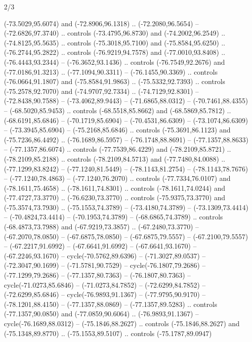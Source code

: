 \begin{flagdescription}{2/3}
\begin{scope}[xshift=0.3333\flaglength,yshift=0.5\flagwidth,scale=\flagwidth/711.3]
\begin{scope}
    (-73.5029,95.6074) and (-72.8906,96.1318) .. (-72.2080,96.5654) --
    (-72.6826,97.3740) .. controls (-73.4795,96.8730) and (-74.2002,96.2549) ..
    (-74.8125,95.5635) .. controls (-75.3018,95.7100) and (-75.8584,95.6250) ..
    (-76.2744,95.2822) .. controls (-76.9219,94.7578) and (-77.0010,93.8408) ..
    (-76.4443,93.2344) -- (-76.3652,93.1436) .. controls (-76.7549,92.2676) and
    (-77.0186,91.3213) .. (-77.1094,90.3311) -- (-76.1455,90.3369) .. controls
    (-76.0664,91.1807) and (-75.8584,91.9863) .. (-75.5332,92.7393) .. controls
    (-75.2578,92.7070) and (-74.9707,92.7334) .. (-74.7129,92.8301) --
    (-72.8438,90.7588) -- (-73.4062,89.9443) -- (-71.6865,88.0312) --
    (-70.7461,88.4355) -- (-68.5020,85.9453) .. controls (-68.5518,85.8662) and
    (-68.5869,85.7812) .. (-68.6191,85.6846) -- (-70.1719,85.6904) --
    (-70.4531,86.6309) -- (-73.1074,86.6309) -- (-73.3945,85.6904) --
    (-75.2168,85.6846) .. controls (-75.3691,86.1123) and (-75.7236,86.4492) ..
    (-76.1689,86.5957) -- (-76.1748,88.8691) -- (-77.1357,88.8633) --
    (-77.1357,86.6074) .. controls (-77.7539,86.4229) and (-78.2109,85.8721) ..
    (-78.2109,85.2188) .. controls (-78.2109,84.5713) and (-77.7480,84.0088) ..
    (-77.1299,83.8242) -- (-77.1240,81.5449) -- (-78.1143,81.2754) --
    (-78.1143,78.7676) -- (-77.1240,78.4863) -- (-77.1240,76.2070) .. controls
    (-77.7334,76.0107) and (-78.1611,75.4658) .. (-78.1611,74.8301) .. controls
    (-78.1611,74.0244) and (-77.4727,73.3770) .. (-76.6230,73.3770) .. controls
    (-75.9375,73.3770) and (-75.3574,73.7930) .. (-75.1553,74.3789) --
    (-73.4180,74.3789) -- (-73.1309,73.4414) -- (-70.4824,73.4414) --
    (-70.1953,74.3789) -- (-68.6865,74.3789) .. controls (-68.4873,73.7988) and
    (-67.9219,73.3857) .. (-67.2480,73.3770) -- (-67.2070,78.0850) --
    (-67.6875,78.0850) -- (-67.6875,79.5557) -- (-67.2100,79.5557) --
    (-67.2217,91.6992) -- (-67.6641,91.6992) -- (-67.6641,93.1670) --
    (-67.2246,93.1670) -- cycle(-70.5762,89.6396) -- (-71.3027,89.0537) --
    (-72.3047,90.1699) -- (-71.5781,90.7529) -- cycle(-76.1807,79.2686) --
    (-77.1299,79.2686) -- (-77.1357,80.7363) -- (-76.1807,80.7363) --
    cycle(-71.0273,85.6846) -- (-71.0273,84.7852) -- (-72.6299,84.7852) --
    (-72.6299,85.6846) -- cycle(-76.9893,91.1367) -- (-77.9795,90.9170) --
    (-78.1201,88.4150) -- (-77.1357,88.0869) -- (-77.1357,89.5283) .. controls
    (-77.1357,90.0850) and (-77.0859,90.6064) .. (-76.9893,91.1367) --
    cycle(-76.1689,88.0312) -- (-75.1846,88.2627) .. controls (-75.1846,88.2627)
    and (-75.1348,89.8770) .. (-75.1553,89.5107) .. controls (-75.1787,89.0947)

\end{scope}
\end{scope}
\end{flagdescription}
